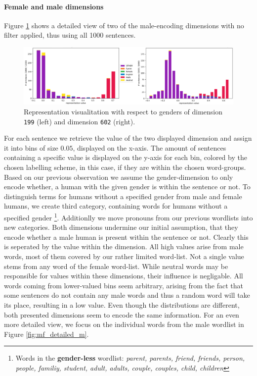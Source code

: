 \paragraph*{Female and male dimensions}
Figure \ref{fig:mf_basic} shows a detailed view of two of the male-encoding dimensions with no filter applied, thus using all 1000 sentences. 
\begin{figure}[tph!]
\centering
	\includegraphics[totalheight=4.5cm]{fig/mf_basic.png}
	\caption{Representation visualitation with respect to genders of dimension \texttt{199} (left) and dimension \texttt{602} (right).}
	\label{fig:mf_basic}
\end{figure}
For each sentence we retrieve the value of the two displayed dimension and assign it into bins of size $0.05$, displayed on the x-axis. The amount of sentences containing a specific value is displayed on the y-axis for each bin, colored by the chosen labelling scheme, in this case, if they are within the chosen word-groups. Based on our previous observation we assume the gender-dimension to only encode whether, a human with the given gender is within the sentence or not. To distinguish terms for humans without a specified gender from male and female humans, we create  third category, containing words for humans without a specified gender \footnote{Words in the \textbf{gender-less} wordlist: \textit{parent, parents, friend, friends, person, people, familiy, student, adult, adults, couple, couples, child, children}}. Additionlly we move pronouns from our previous wordlists into new categories. 
Both dimensions undermine our initial assumption, that they encode whether a male human is present within the sentence or not. Clearly this is seperated by the value within the dimension. All high values arise from male words, most of them covered by our rather limited word-list. Not a single value stems from any word of the female word-list. While neutral words may be responsible for values within these dimensions, their influence is negligable. All words coming from lower-valued bins seem arbitrary, arising from the fact that some sentences do not contain any male words and thus a random word will take its place, resulting in a low value. Even though the distributions are different, both presented dimensions seem to encode the same information. For an even more detailed view, we focus on the individual words from the male wordlist in Figure \ref{fig:mf_detailed_m}.
